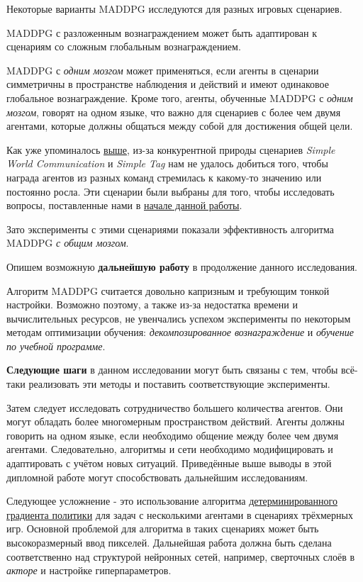Некоторые варианты MADDPG исследуются для разных игровых сценариев.

MADDPG с разложенным вознаграждением может быть адаптирован к сценариям со сложным глобальным вознаграждением.

MADDPG с \textit{одним мозгом} может применяться, если агенты в сценарии симметричны в пространстве наблюдения и действий и имеют одинаковое глобальное вознаграждение. Кроме того, агенты, обученные MADDPG с \textit{одним мозгом}, говорят на одном языке, что важно для сценариев с более чем двумя агентами, которые должны общаться между собой для достижения общей цели.

Как уже упоминалось \hyperref[exp-results-svc]{выше}, из-за конкурентной природы сценариев \textit{Simple World Communication} и \textit{Simple Tag} нам не удалось добиться того, чтобы награда агентов из разных команд стремилась к какому-то значению или постоянно росла. Эти сценарии были выбраны для того, чтобы исследовать вопросы, поставленные нами в \hyperref[intro-questions]{начале данной работы}.

Зато эксперименты с этими сценариями показали эффективность алгоритма MADDPG \textit{с общим мозгом}.

Опишем возможную \textbf{дальнейшую работу} в продолжение данного исследования.

Алгоритм MADDPG считается довольно капризным и требующим тонкой настройки. Возможно поэтому, а также из-за недостатка времени и вычислительных ресурсов, не увенчались успехом эксперименты по некоторым методам оптимизации обучения: \textit{декомпозированное вознаграждение} и \textit{обучение по учебной программе}.

\textbf{Следующие шаги} в данном исследовании могут быть связаны с тем, чтобы всё-таки реализовать эти методы и поставить соответствующие эксперименты.

Затем следует исследовать сотрудничество большего количества агентов. Они могут обладать более многомерным пространством действий. Агенты должны говорить на одном языке, если необходимо общение между более чем двумя агентами. Следовательно, алгоритмы и сети необходимо модифицировать и адаптировать с учётом новых ситуаций. Приведённые выше выводы в этой дипломной работе могут способствовать дальнейшим исследованиям.

Следующее усложнение - это использование алгоритма \hyperref[acr:dpg]{детерминированного градиента политики} для задач с несколькими агентами в сценариях трёхмерных игр. Основной проблемой для алгоритма в таких сценариях может быть высокоразмерный ввод пикселей. Дальнейшая работа должна быть сделана соответственно над структурой нейронных сетей, например, сверточных слоёв в \textit{акторе} и настройке гиперпараметров.

